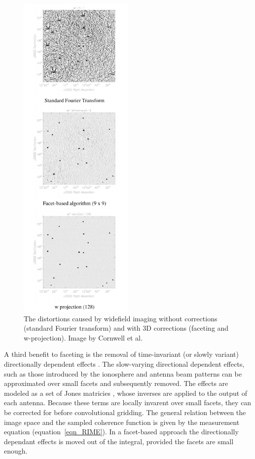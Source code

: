 \documentclass[a4paper, two column]{article}
\begin{document}
\begin{figure}[h]
 \begin{mdframed}
 \centering
 \includegraphics[width=0.5\textwidth]{3d_correction.png}
 \caption{The distortions caused by widefield imaging without corrections (standard Fourier transform) and with 3D corrections (faceting and w-projection). Image by Cornwell et al. \cite{1416440}}
  \label{FIG_3D_DISTORTIONS}
 \end{mdframed}
\end{figure}

A third benefit to faceting is the removal of time-invariant (or slowly variant) directionally dependent effects \cite{2011A&A...527A.107S}. The slow-varying directional dependent effects, such as those introduced by the 
ionosphere and antenna beam patterns can be approximated over small facets and subsequently removed. The effects are modeled as a set of Jones matricies \cite{2011A&A...527A.106S}, whose inverses are applied to the output of each antenna. Because these terms are locally invarent over small 
facets, they can be corrected for before convolutional gridding. The general relation between the image space and the sampled coherence function is given by the measurement equation (equation~\ref{eqn_RIME}). In a facet-based approach
the directionally dependant effects is moved out of the integral, provided the facets are small enough.
\end{document}
